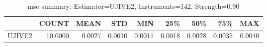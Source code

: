 \begin{table}[ht]
\centering
\caption{mse summary: Estimator=UJIVE2, Instruments=142, Strength=0.90}
\begin{tabular}{lrrrrrrrr}
\toprule
 & COUNT & MEAN & STD & MIN & 25\% & 50\% & 75\% & MAX \\
\midrule
UJIVE2 & 10.0000 & 0.0027 & 0.0010 & 0.0011 & 0.0018 & 0.0028 & 0.0035 & 0.0040 \\
\bottomrule
\end{tabular}
\end{table}
